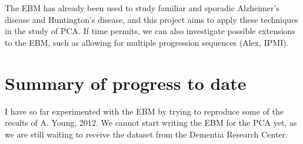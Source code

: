 \documentclass[11pt,a4paper,oneside]{report}
\begin{document}
The EBM has already been used to study familiar and sporadic Alzheimer's disease and Huntington's disease, and this project aims to apply these techniques in the study of PCA. If time permits, we can also investigate possible extensions to the EBM, such as allowing for multiple progression sequences (Alex, IPMI).

\section*{Summary of progress to date}

I have so far experimented with the EBM by trying to reproduce some of the results of A. Young, 2012. We cannot start writing the EBM for the PCA yet, as we are still waiting to receive the dataset from the Dementia Research Center.
\end{document}

